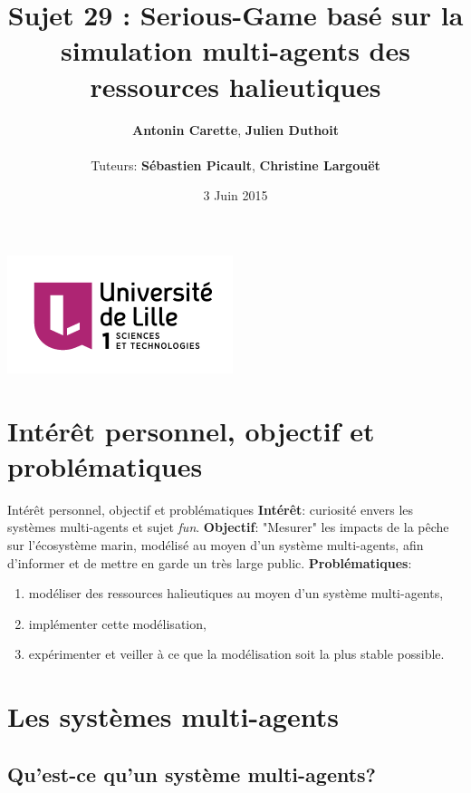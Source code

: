\documentclass[t, 10pt]{beamer}
\title[Soutenance de ProJet Individuel (PJI)]{\textbf{Sujet 29} : Serious-Game basé sur la simulation multi-agents des ressources halieutiques}
\author[Antonin Carette, Julien Duthoit]{\textbf{Antonin Carette}, \textbf{Julien Duthoit}\\ \\Tuteurs: \textbf{Sébastien Picault}, \textbf{Christine Largouët}}
\institute{Master 1 Informatique - Université Lille1}
\date{3 Juin 2015}
\begin{document}
	\begin{frame}
	\titlepage
	\includegraphics[scale=0.4]{img/logo-lille1.png}
	\end{frame}

	\begin{frame}
		\tableofcontents
	\end{frame}

	\section{Intérêt personnel, objectif et problématiques}
	
	\begin{frame}[c]{Intérêt personnel, objectif et problématiques}
		\textbf{Intérêt}: curiosité envers les systèmes multi-agents et sujet \textit{fun}.
		\pause
		\newline
		\newline
		\textbf{Objectif}: "Mesurer" les impacts de la pêche sur l'écosystème marin, modélisé au moyen d'un système multi-agents, afin d'informer et de mettre en garde un très large public.
		\pause
		\newline
		\newline
		\textbf{Problématiques}:
			\begin{enumerate}
				\item{modéliser des ressources halieutiques au moyen d'un système multi-agents,}
				\item{implémenter cette modélisation,}
				\item{expérimenter et veiller à ce que la modélisation soit la plus stable possible.}
			\end{enumerate}
	\end{frame}
	
	\section{Les systèmes multi-agents}
	
	\subsection{Qu'est-ce qu'un système multi-agents?}
	
\end{document}
